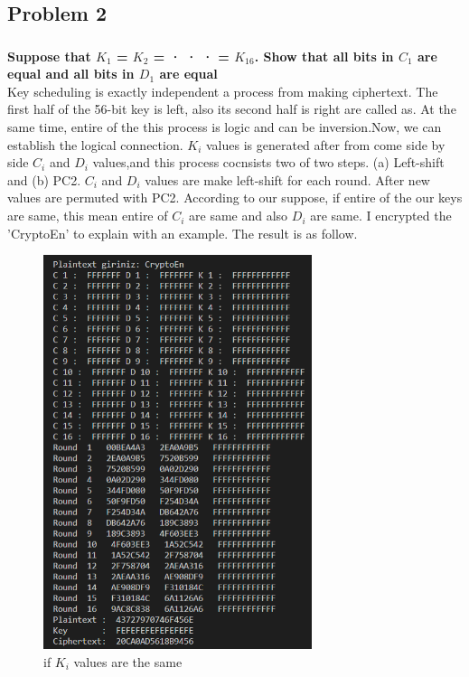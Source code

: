 \documentclass[11pt]{article}
\begin{document}
\subsection{Problem 2}
\subsubsection{}
\textbf{Suppose that $K_{1}$ = $K_{2}$ = · · · = $K_{16}$. Show that all bits in $C_{1}$ are equal and all bits in $D_{1}$
are equal}\\
 
Key scheduling is exactly independent a process from making ciphertext. The first half of the 56-bit key is left, also its second half 
is right are called as. At the same time, entire of the this process is logic and can be inversion.Now, we can establish the logical connection. 
$K_{i}$ values is generated after from come side by side $C_{i}$  and $D_{i}$ values,and this process cocnsists two of two steps.
(a) Left-shift and (b) PC2. $C_{i}$  and $D_{i}$ values are make left-shift for each round. After new values are permuted with PC2. According to our suppose,
if entire of the our keys are same, this mean entire of  $C_{i}$ are same and also $D_{i}$ are same. I encrypted the 'CryptoEn' to explain with an example.
The result is as follow.\\
\begin{figure}[!h]
  \centering
  \includegraphics[width=0.7\textwidth]{Screenshot_3.png}
  \caption{if $K_{i}$ values are the same }
  \label{fig:boat1}
\end{figure}
\end{document}
